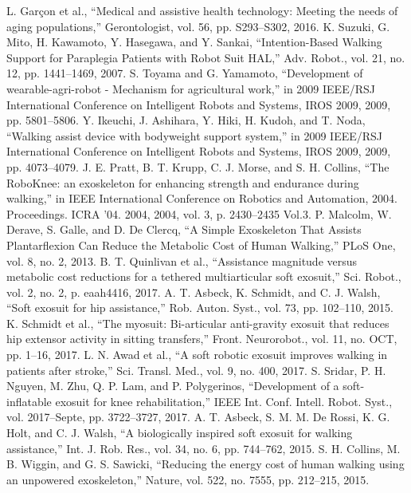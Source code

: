 \documentclass[letterpaper, 10 pt, conference]{ieeeconf}  %
\begin{document}
\begin{thebibliography}{10}

	L. Garçon et al., “Medical and assistive health technology: Meeting the needs of aging populations,” Gerontologist, vol. 56, pp. S293–S302, 2016.
	K. Suzuki, G. Mito, H. Kawamoto, Y. Hasegawa, and Y. Sankai, “Intention-Based Walking Support for Paraplegia Patients with Robot Suit HAL,” Adv. Robot., vol. 21, no. 12, pp. 1441–1469, 2007.
	S. Toyama and G. Yamamoto, “Development of wearable-agri-robot - Mechanism for agricultural work,” in 2009 IEEE/RSJ International Conference on Intelligent Robots and Systems, IROS 2009, 2009, pp. 5801–5806.
	Y. Ikeuchi, J. Ashihara, Y. Hiki, H. Kudoh, and T. Noda, “Walking assist device with bodyweight support system,” in 2009 IEEE/RSJ International Conference on Intelligent Robots and Systems, IROS 2009, 2009, pp. 4073–4079.
	J. E. Pratt, B. T. Krupp, C. J. Morse, and S. H. Collins, “The RoboKnee: an exoskeleton for enhancing strength and endurance during walking,” in IEEE International Conference on Robotics and Automation, 2004. Proceedings. ICRA ’04. 2004, 2004, vol. 3, p. 2430–2435 Vol.3.
	P. Malcolm, W. Derave, S. Galle, and D. De Clercq, “A Simple Exoskeleton That Assists Plantarflexion Can Reduce the Metabolic Cost of Human Walking,” PLoS One, vol. 8, no. 2, 2013.
	B. T. Quinlivan et al., “Assistance magnitude versus metabolic cost reductions for a tethered multiarticular soft exosuit,” Sci. Robot., vol. 2, no. 2, p. eaah4416, 2017.
	A. T. Asbeck, K. Schmidt, and C. J. Walsh, “Soft exosuit for hip assistance,” Rob. Auton. Syst., vol. 73, pp. 102–110, 2015.
	K. Schmidt et al., “The myosuit: Bi-articular anti-gravity exosuit that reduces hip extensor activity in sitting transfers,” Front. Neurorobot., vol. 11, no. OCT, pp. 1–16, 2017.
	L. N. Awad et al., “A soft robotic exosuit improves walking in patients after stroke,” Sci. Transl. Med., vol. 9, no. 400, 2017.
	S. Sridar, P. H. Nguyen, M. Zhu, Q. P. Lam, and P. Polygerinos, “Development of a soft-inflatable exosuit for knee rehabilitation,” IEEE Int. Conf. Intell. Robot. Syst., vol. 2017–Septe, pp. 3722–3727, 2017.
	A. T. Asbeck, S. M. M. De Rossi, K. G. Holt, and C. J. Walsh, “A biologically inspired soft exosuit for walking assistance,” Int. J. Rob. Res., vol. 34, no. 6, pp. 744–762, 2015.
	S. H. Collins, M. B. Wiggin, and G. S. Sawicki, “Reducing the energy cost of human walking using an unpowered exoskeleton,” Nature, vol. 522, no. 7555, pp. 212–215, 2015.

\end{thebibliography}
\end{document}
